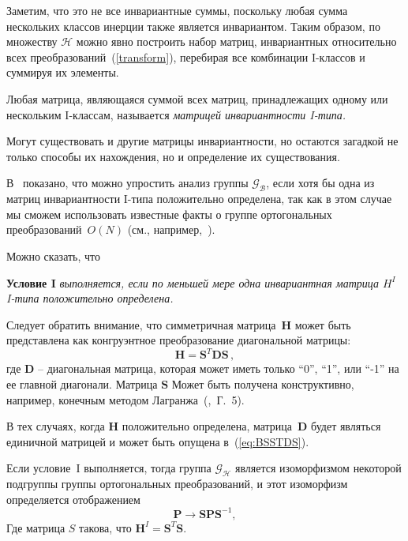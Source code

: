 Заметим, что это не все инвариантные суммы, поскольку любая сумма нескольких классов инерции также является инвариантом. Таким образом, по множеству $ {\mathcal{H}} $ можно явно построить набор матриц, инвариантных относительно всех преобразований~(\ref {transform}), перебирая все комбинации I-классов и суммируя их элементы.

\begin{definition}
Любая матрица, являющаяся суммой всех матриц, принадлежащих одному или нескольким I-классам, называется {\em матрицей инвариантности I-типа.}
\end{definition}

Могут существовать и другие матрицы инвариантности, но остаются загадкой не только способы их нахождения, но и определение их существования.

В~\cite{yurkov:symmetry} показано, что можно упростить анализ группы $\mathcal{G}_{\mathcal{B}}$, если хотя бы одна из матриц инвариантности I-типа положительно определена, так как в этом случае мы сможем использовать известные факты о группе ортогональных преобразований~$O(N)$ (см., например,~\cite{Zhelobenko}).

Можно сказать, что

\textbf{Условие I} {\em выполняется, если по меньшей мере одна инвариантная матрица $H^I$ I-типа положительно определена.}

Следует обратить внимание, что симметричная матрица~$\textbf{H}$ может быть представлена как конгруэнтное преобразование диагональной матрицы:
%
\begin{equation}
\label{eq:BSSTDS}
\textbf{H}=\textbf{S}^T\textbf{DS} \, ,
\end{equation}
%
где $\textbf{D}$ -- диагональная матрица, которая может иметь только ``0'', ``1'', или ``-1'' на ее главной диагонали. Матрица $\textbf{S}$ Может быть получена конструктивно, например, конечным методом Лагранжа~(\cite{Lancaster},~Г.~5).

В тех случаях, когда $\textbf{H}$ положительно определена, матрица~$\textbf{D}$ будет являться единичной матрицей и может быть опущена в~(\ref{eq:BSSTDS}).

\begin{proposition} \label{prop:orthogonal} Если условие~I выполняется, тогда группа $ {\mathcal{G}}_{\mathcal{H}} $ является изоморфизмом некоторой подгруппы группы ортогональных преобразований, и этот изоморфизм определяется отображением
\begin{equation}
\label{eq:Qdef_map}
\textbf{P} \to \textbf{SPS}^{-1},
\end{equation}
Где матрица $S$ такова, что $\textbf{H}^I=\textbf{S}^T \textbf{S}.$
\end{proposition}

